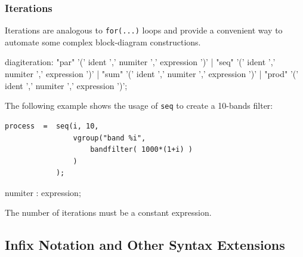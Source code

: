

\subsubsection{Iterations} 
Iterations are analogous to \lstinline'for(...)' loops and provide a convenient way to automate some complex block-diagram constructions. 


\begin{rail}
diagiteration: "par" '(' ident ',' numiter ',' expression ')'
           | "seq" '(' ident ',' numiter ',' expression ')'
           | "sum" '(' ident ',' numiter ',' expression ')'
           | "prod" '(' ident ',' numiter ',' expression ')';
\end{rail}

The following example shows the usage of  \lstinline'seq' to create a 10-bands filter:

\begin{lstlisting}
process  =	seq(i, 10, 
				vgroup("band %i", 
					bandfilter( 1000*(1+i) ) 
				) 
			);
\end{lstlisting}

\begin{rail}
numiter : expression;
\end{rail}
The number of iterations must be a constant expression. 

\subsection{Infix Notation and Other Syntax Extensions}


